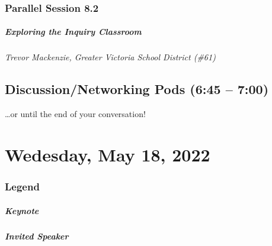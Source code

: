 \documentclass[
]{book}
\begin{document}
\hypertarget{parallel-session-8.2}{%
\subsection*{Parallel Session 8.2}\label{parallel-session-8.2}}

\begin{reflect}
\hypertarget{exploring-the-inquiry-classroom}{%
\paragraph{Exploring the Inquiry
Classroom}\label{exploring-the-inquiry-classroom}}

\emph{Trevor Mackenzie, Greater Victoria School District (\#61)}
\end{reflect}

\hypertarget{discussionnetworking-pods-645-700-1}{%
\section*{Discussion/Networking Pods (6:45 -- 7:00)}\label{discussionnetworking-pods-645-700-1}}

\ldots or until the end of your conversation!

\hypertarget{wedesday-may-18-2022}{%
\chapter{Wedesday, May 18, 2022}\label{wedesday-may-18-2022}}

\hypertarget{legend-2}{%
\subsection*{Legend}\label{legend-2}}

\begin{reflect}
\hypertarget{keynote}{%
\paragraph{Keynote}\label{keynote}}
\end{reflect}

\begin{wp}
\hypertarget{invited-speaker}{%
\paragraph{Invited Speaker}\label{invited-speaker}}
\end{wp}
\end{document}
